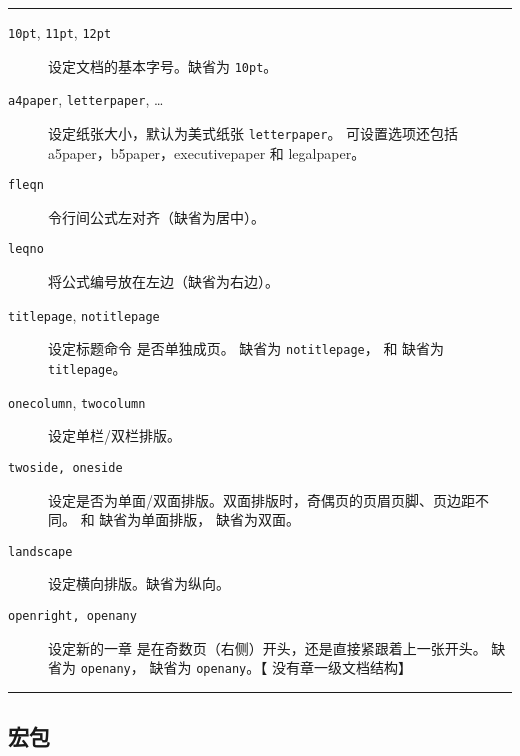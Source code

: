 \begin{table}[!hbp]
\caption{\LaTeX\ 标准的三个文档类可设定的选项}\label{tbl:ltx-options}
\hrule
\begin{flushleft}
\begin{description}
\item[\normalfont\texttt{10pt}, \texttt{11pt}, \texttt{12pt}] \quad 设定文档的基本字号。缺省为 \texttt{10pt}。

\item[\normalfont\texttt{a4paper}, \texttt{letterpaper}, \ldots] \quad 设定纸张大小，默认为美式纸张 \texttt{letterpaper}。
可设置选项还包括 a5paper，b5paper，executivepaper 和 legalpaper。

\item[\normalfont\texttt{fleqn}] \quad 令行间公式左对齐（缺省为居中）。

\item[\normalfont\texttt{leqno}] \quad 将公式编号放在左边（缺省为右边）。

\item[\normalfont\texttt{titlepage}, \texttt{notitlepage}] 设定标题命令  是否单独成页。
 缺省为 \texttt{notitlepage}， 和  缺省为 \texttt{titlepage}。

\item[\normalfont\texttt{onecolumn}, \texttt{twocolumn}] \quad 设定单栏/双栏排版。

\item[\normalfont\texttt{twoside, oneside}] \quad 设定是否为单面/双面排版。双面排版时，奇偶页的页眉页脚、页边距不同。
 和  缺省为单面排版， 缺省为双面。

\item[\normalfont\texttt{landscape}] \quad 设定横向排版。缺省为纵向。

\item[\normalfont\texttt{openright, openany}] \quad 设定新的一章  是在奇数页（右侧）开头，还是直接紧跟着上一张开头。
 缺省为 \texttt{openany}， 缺省为 \texttt{openany}。【 没有章一级文档结构】
\end{description}
\end{flushleft}
\hrule
\end{table}

\subsection{宏包}\label{subsec:packages}

